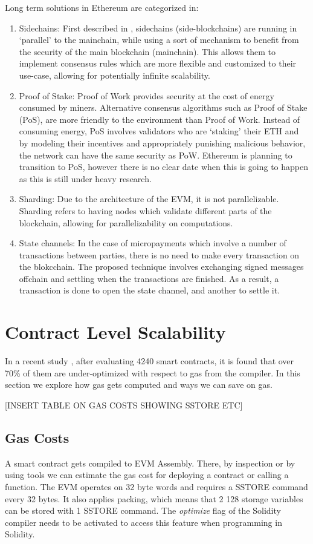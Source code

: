 Long term solutions in Ethereum are categorized in:
\begin{enumerate}
    \item Sidechains: First described in \cite{sidechains}, sidechains (side-blockchains) are running in `parallel' to the mainchain, while using a sort of mechanism to benefit from the security of the main blockchain (mainchain). This allows them to implement consensus rules which are more flexible and customized to their use-case, allowing for potentially infinite scalability.
    \item Proof of Stake: Proof of Work provides security at the cost of energy consumed by miners. Alternative consensus algorithms such as Proof of Stake (PoS), are more friendly to the environment than Proof of Work\cite{powenv}. Instead of consuming energy, PoS involves validators who are `staking' their ETH and by modeling their incentives and appropriately punishing malicious behavior, the network can have the same security as PoW. Ethereum is planning to transition to PoS, however there is no clear date when this is going to happen as this is still under heavy research.
    \item Sharding: Due to the architecture of the EVM, it is not parallelizable. Sharding refers to having nodes which validate different parts of the blockchain, allowing for parallelizability on computations. 
    \item State channels: In the case of micropayments which involve a number of transactions between parties, there is no need to make every transaction on the blokcchain. The proposed technique involves exchanging signed messages offchain and settling when the transactions are finished. As a result, a transaction is done to open the state channel, and another to settle it.
\end{enumerate}
    
\section{Contract Level Scalability}
In a recent study \cite{DBLP:journals/corr/ChenLLZ17}, after evaluating 4240 smart contracts, it is found that over 70\% of them are under-optimized with respect to gas from the compiler. In this section we explore how gas gets computed and ways we can save on gas.

[INSERT TABLE ON GAS COSTS SHOWING SSTORE ETC]
% 

\subsection{Gas Costs}
A smart contract gets compiled to EVM Assembly. There, by inspection or by using tools we can estimate the gas cost for deploying a contract or calling a function. The EVM operates on 32 byte words and requires a SSTORE command every 32 bytes. It also applies packing, which means that 2 128 storage variables can be stored with 1 SSTORE command. The \textit{optimize} flag of the Solidity compiler needs to be activated to access this feature when programming in Solidity.

